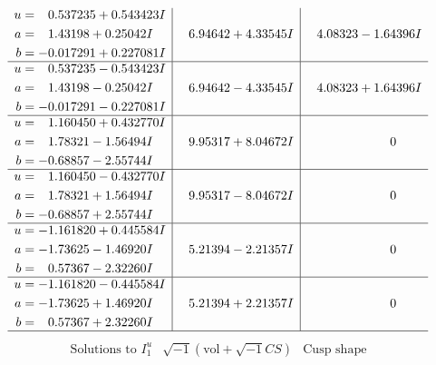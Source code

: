 \documentclass[1p]{elsarticle_modified}
\theoremstyle{definition}
\newcommand{\I}{\sqrt{-1}}
\begin{document}
$$\begin{array}{c|c|c}
\begin{aligned}
u &= \phantom{-}0.537235 + 0.543423 I \\
a &= \phantom{-}1.43198 + 0.25042 I \\
b &= -0.017291 + 0.227081 I\end{aligned}
 & \phantom{-}6.94642 + 4.33545 I & \phantom{-}4.08323 - 1.64396 I \\ \hline\begin{aligned}
u &= \phantom{-}0.537235 - 0.543423 I \\
a &= \phantom{-}1.43198 - 0.25042 I \\
b &= -0.017291 - 0.227081 I\end{aligned}
 & \phantom{-}6.94642 - 4.33545 I & \phantom{-}4.08323 + 1.64396 I \\ \hline\begin{aligned}
u &= \phantom{-}1.160450 + 0.432770 I \\
a &= \phantom{-}1.78321 - 1.56494 I \\
b &= -0.68857 - 2.55744 I\end{aligned}
 & \phantom{-}9.95317 + 8.04672 I & \phantom{-0.000000 } 0 \\ \hline\begin{aligned}
u &= \phantom{-}1.160450 - 0.432770 I \\
a &= \phantom{-}1.78321 + 1.56494 I \\
b &= -0.68857 + 2.55744 I\end{aligned}
 & \phantom{-}9.95317 - 8.04672 I & \phantom{-0.000000 } 0 \\ \hline\begin{aligned}
u &= -1.161820 + 0.445584 I \\
a &= -1.73625 - 1.46920 I \\
b &= \phantom{-}0.57367 - 2.32260 I\end{aligned}
 & \phantom{-}5.21394 - 2.21357 I & \phantom{-0.000000 } 0 \\ \hline\begin{aligned}
u &= -1.161820 - 0.445584 I \\
a &= -1.73625 + 1.46920 I \\
b &= \phantom{-}0.57367 + 2.32260 I\end{aligned}
 & \phantom{-}5.21394 + 2.21357 I & \phantom{-0.000000 } 0\\
 \hline 
 \end{array}$$\newpage$$\begin{array}{c|c|c}  
\text{Solutions to }I^u_{1}& \I (\text{vol} + \sqrt{-1}CS) & \text{Cusp shape}\\

\end{array}$$
\end{document}
